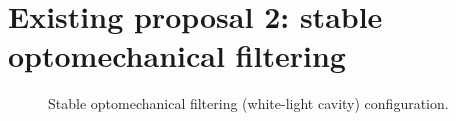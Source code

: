 \section{Existing proposal 2: stable optomechanical filtering}

\begin{figure}
	\centering
	\caption{Stable optomechanical filtering (white-light cavity) configuration.}
	\label{fig:}
\end{figure}




